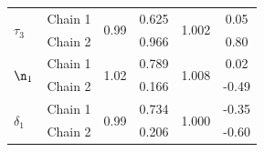 \begin{table}[H]
\begin{tabular}{lccccc}
\multirow{2}{*}{$\tau_3$} & Chain 1 & \multirow{2}{*}{0.99} & 0.625 & \multirow{2}{*}{1.002} & 0.05 \\
 & Chain 2 & & 0.966 & & 0.80 \\
\midrule
\multirow{2}{*}{$\n_1$} & Chain 1 & \multirow{2}{*}{1.02} & 0.789 & \multirow{2}{*}{1.008} & 0.02 \\
 & Chain 2 & & 0.166 & & -0.49 \\
\midrule
\multirow{2}{*}{$\delta_1$} & Chain 1 & \multirow{2}{*}{0.99} & 0.734 & \multirow{2}{*}{1.000} & -0.35 \\
 & Chain 2 & & 0.206 & & -0.60 \\
\bottomrule
\end{tabular}
\end{table}
